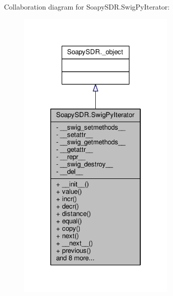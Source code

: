 Collaboration diagram for Soapy\+S\+D\+R.\+Swig\+Py\+Iterator\+:
\nopagebreak
\begin{figure}[H]
\begin{center}
\leavevmode
\includegraphics[width=214pt]{d7/d16/classSoapySDR_1_1SwigPyIterator__coll__graph}
\end{center}
\end{figure}
